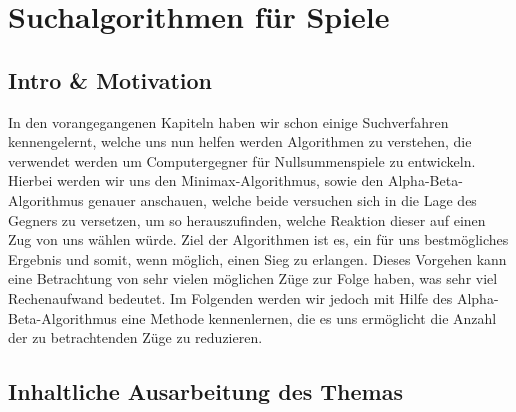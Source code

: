 
\chapter{Suchalgorithmen für Spiele}

\usetikzlibrary{arrows}
\usetikzlibrary{calc}
\usetikzlibrary{positioning}
\usetikzlibrary{matrix}




\section{Intro \& Motivation}

In den vorangegangenen Kapiteln haben wir schon einige Suchverfahren kennengelernt, welche uns nun helfen werden Algorithmen zu verstehen, die verwendet werden um Computergegner für Nullsummenspiele zu entwickeln. Hierbei werden wir uns den Minimax-Algorithmus, sowie den Alpha-Beta-Algorithmus genauer anschauen, welche beide versuchen sich in die Lage des Gegners zu versetzen, um so  herauszufinden, welche Reaktion dieser auf einen Zug von uns wählen würde. Ziel der Algorithmen ist es, ein für uns bestmögliches Ergebnis und somit, wenn möglich, einen Sieg zu erlangen. Dieses Vorgehen kann eine Betrachtung von sehr vielen möglichen Züge zur Folge haben, was sehr viel Rechenaufwand bedeutet. Im Folgenden werden wir jedoch  mit Hilfe des Alpha-Beta-Algorithmus eine Methode kennenlernen, die es uns ermöglicht die Anzahl der zu betrachtenden Züge zu reduzieren.



\section{Inhaltliche Ausarbeitung des Themas}

